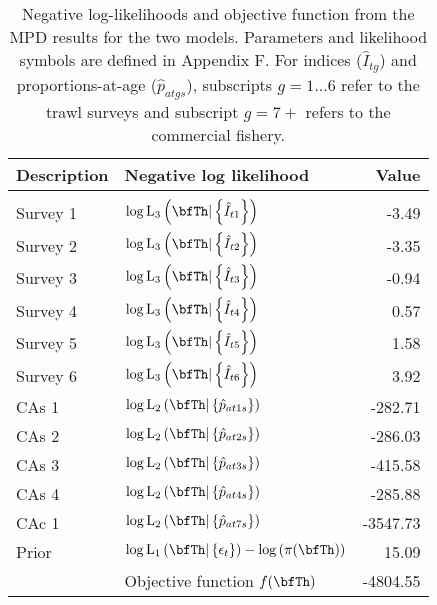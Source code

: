
\begin{table}[!p]
\centering
\caption{\label{tab:like}  Negative log-likelihoods and objective function from the MPD results for the two models. Parameters and likelihood symbols are defined in Appendix F. For indices ($\hat{I}_{tg}$) and proportions-at-age ($\hat{p}_{atgs}$), subscripts $g=1...6$ refer to the trawl surveys and subscript $g=7+$ refers to the commercial fishery.}
\begin{tabular}{llr} 
\hline
Description & Negative log likelihood & Value \\
\hline \\[0.2pt]
Survey 1 & $\log \mbox{L}_{3} \left( \bfTh | \left\{ \hat{I}_{t1} \right\} \right)$ & -3.49\\[6pt]
Survey 2 & $\log \mbox{L}_{3} \left( \bfTh | \left\{ \hat{I}_{t2} \right\} \right)$ & -3.35\\[6pt]
Survey 3 & $\log \mbox{L}_{3} \left( \bfTh | \left\{ \hat{I}_{t3} \right\} \right)$ & -0.94\\[6pt]
Survey 4 & $\log \mbox{L}_{3} \left( \bfTh | \left\{ \hat{I}_{t4} \right\} \right)$ & 0.57\\[6pt]
Survey 5 & $\log \mbox{L}_{3} \left( \bfTh | \left\{ \hat{I}_{t5} \right\} \right)$ & 1.58\\[6pt]
Survey 6 & $\log \mbox{L}_{3} \left( \bfTh | \left\{ \hat{I}_{t6} \right\} \right)$ & 3.92\\[6pt]
CAs 1    & $\log \mbox{L}_{2} \left( \bfTh | \left\{ \hat{p}_{at1s} \right\} \right)$ & -282.71 \\[6pt] 
CAs 2    & $\log \mbox{L}_{2} \left( \bfTh | \left\{ \hat{p}_{at2s} \right\} \right)$ & -286.03 \\[6pt] 
CAs 3    & $\log \mbox{L}_{2} \left( \bfTh | \left\{ \hat{p}_{at3s} \right\} \right)$ & -415.58 \\[6pt] 
CAs 4    & $\log \mbox{L}_{2} \left( \bfTh | \left\{ \hat{p}_{at4s} \right\} \right)$ & -285.88 \\[6pt] 
CAc 1    & $\log \mbox{L}_{2} \left( \bfTh | \left\{ \hat{p}_{at7s} \right\} \right)$ & -3547.73 \\[6pt] 
Prior    & $\log \mbox{L}_{1} \left( \bfTh | \left\{ \epsilon_t \right\} \right) - \log \left( \pi( \bfTh ) \right)$ & 15.09 \\[6pt]  

\hline
~ & Objective function $f( \bfTh)$ & -4804.55 \\
\hline
\end{tabular}
\end{table}


